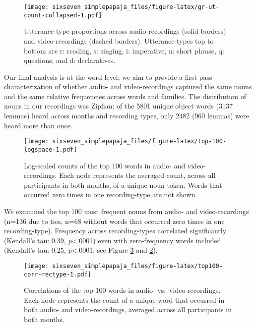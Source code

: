 \documentclass[floatsintext,man]{apa6}
\theoremstyle{definition}
\theoremstyle{definition}
\theoremstyle{definition}
\theoremstyle{remark}
\begin{document}
\begin{figure}
\centering
\texttt{[image: sixseven\_simplepapaja\_files/figure-latex/gr-ut-count-collapsed-1.pdf]}
\caption{\label{fig:gr-ut-count-collapsed}Utterance-type proportions across
audio-recordings (solid borders) and video-recordings (dashed borders).
Utterance-types top to bottom are r: reading, s: singing, i: imperative,
n: short phrase, q: questions, and d: declaratives.}
\end{figure}

Our final analysis is at the word level; we aim to provide a first-pass
characterization of whether audio- and video-recordings captured the
same nouns and the same relative frequencies across words and families.
The distribution of nouns in our recordings was Zipfian: of the 5801
unique object words (3137 lemmas) heard across months and recording
types, only 2482 (960 lemmas) were heard more than once.

\begin{figure}
\centering
\texttt{[image: sixseven\_simplepapaja\_files/figure-latex/top-100-logspace-1.pdf]}
\caption{\label{fig:top-100-logspace}Log-scaled counts of the top 100 words
in audio- and video-recordings. Each node represents the averaged count,
across all participants in both months, of a unique noun-token. Words
that occurred zero times in one recording-type are not shown.}
\end{figure}

We examined the top 100 most frequent nouns from audio- and
video-recordings (n=136 due to ties, n=68 without words that occurred
zero times in one recording-type). Frequency across recording-types
correlated significantly (Kendall's tau: 0.39, \emph{p}\textless{}.0001)
even with zero-frequency words included (Kendall's tau: 0.25,
\emph{p}\textless{}.0001; see Figure \ref{fig:top100-corr-rectype} and
\ref{fig:top-100-logspace}).

\begin{figure}
\centering
\texttt{[image: sixseven\_simplepapaja\_files/figure-latex/top100-corr-rectype-1.pdf]}
\caption{\label{fig:top100-corr-rectype}Correlations of the top 100 words in
audio- vs.~video-recordings. Each node represents the count of a unique
word that occurred in both audio- and video-recordings, averaged across
all participants in both months.}
\end{figure}
\end{document}
